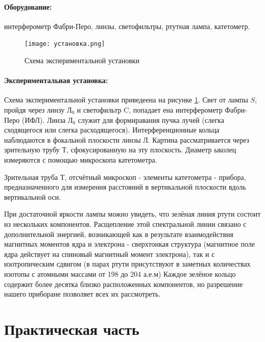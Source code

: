 \documentclass[a4paper,12pt]{article} %
\begin{document}
\paragraph{Оборудование:} интерферометр Фабри-Перо, линзы, светофильтры, ртутная лампа, катетометр.

\begin{figure}[h]
\begin{center}
    \texttt{[image: установка.png]}
\end{center}
    \caption{Схема экспериментальной установки}
    \label{img1}
\end{figure}

\paragraph{Экспериментальная установка:} Схема экспериментальной установки приведеена на рисунке \ref{img1}. Свет от лампы $S$, пройдя через линзу $\text{Л}_0$ и светофильтр $\text{C}$, попадает ена интерферометр Фабри-Перо ($\text{ИФЛ}$). Линза $\text{Л}_0$ служит для формиравания пучка лучей (слегка сходящегося или слегка расходящегося). Интерференционные кольца наблюдаются в фокальной плоскости линзы $\text{Л}$. Картина рассматривается через зрительную трубу $\text{Т}$, сфокусированную на эту плоскость. Диаметр ыколец измеряются с помощью микроскопа катетометра. 

Зрительная труба $\text{Т}$, отсчётный микроскоп - элементы катетометра - прибора, предназначенного для измерения расстояний в вертикальной плоскости вдоль вертикальной оси.

При достаточной яркости лампы можно увидеть, что зелёная линия ртути состоит из нескольких компонентов. Расщепление этой спектральной линии связано с дополнительной энергией, возникающей как в результате взаимодействия магнитных моментов ядра и электрона - $\textit{сверхтонкая структура}$ (магнитное поле ядра действует на спиновый магнитный момент электрона), так и с $\textit{изотропическим сдвигом}$ (в парах ртути присутствуют в заметных количествах изотопы с атомными массами от 198 до 204 а.е.м) Каждое зелёное кольцо содержит более десятка близко расположенных компонентов, но разрешение нашего приборане позволяет всех их рассмотреть.

\section{Практическая часть}
\end{document}
